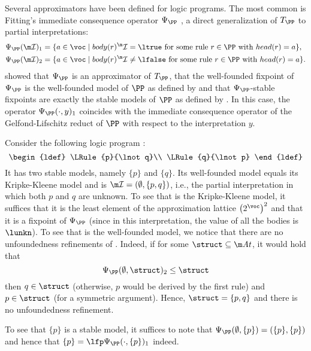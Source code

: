 Several approximators have been defined for logic programs. The most common is Fitting's immediate consequence operator $\Psi_\PP$ \cite{tcs/Fitting02}, a direct
generalization of $T_\PP$ to partial interpretations:
  \begin{align*}
    \Psi_\PP(\pstruct)_1 &=\{a\in \voc\mid body(r)^\pstruct=\ltrue \text{ for some rule $r\in \PP$ with }head(r)=a\},\\
    \Psi_\PP(\pstruct)_2 &=\{a\in \voc\mid body(r)^\pstruct\neq \lfalse \text{ for some rule $r\in \PP$ with }head(r)=a\}.
   \end{align*}
\citet{DeneckerMT00} showed that $\Psi_\PP$ is an approximator of $T_\PP$, that  the well-founded fixpoint of $\Psi_\PP$ is the well-founded model of $\PP$ as defined by \citeauthor{GelderRS91} and that $\Psi_\PP$-stable fixpoints are exactly the stable models of $\PP$ as defined by \citeauthor{iclp/GelfondL88}. In this case, 
the operator $\Psi_\PP(\cdot,y)_1$ coincides with the immediate consequence operator of the Gelfond-Lifschitz reduct \cite{iclp/GelfondL88}  of $\PP$ with respect to the interpretation $y$. 

	
\begin{example}
	Consider the following logic program \PP:
	\[	\begin{ldef}
			\LRule{p}{\lnot q}\\
			\LRule{q}{\lnot p}
		\end{ldef}
	\]
	It has two stable models, namely $\{p\}$ and $\{q\}$. Its well-founded model equals its Kripke-Kleene model and is $\pstruct = (\emptyset,\{p,q\})$, i.e., the partial interpretation in which both $p$ and $q$ are unknown. 
	To see that \pstruct is the Kripke-Kleene model, it suffices that it is the least element of the approximation lattice $\left(2^\voc\right)^2$ and that it is a fixpoint of $\Psi_\PP$ (since in this interpretation, the value of all the bodies is $\lunkn$). 
	To see that \pstruct is the well-founded model, we notice that there are no unfoundedness refinements of \pstruct.
	Indeed, if for some $\struct\subseteq \atoms$, it would hold that 
	\[\Psi_\PP(\emptyset,\struct)_2\leq \struct\] then $q\in\struct$ (otherwise, $p$ would be derived by the first rule) and $p \in \struct$ (for a symmetric argument). Hence, $\struct = \{p,q\}$ and there is no unfoundedness refinement. 
	
	To see that $\{p\}$ is a stable model, it suffices to note that $\Psi_\PP(\emptyset, \{p\}) = (\{p\},\{p\})$ and hence that $\{p\} = \lfp \Psi_\PP(\cdot, \{p\})_1$ indeed. 
\end{example}
